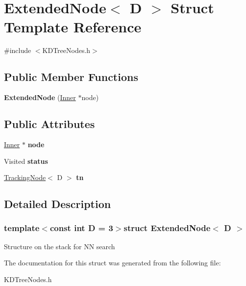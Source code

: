 \hypertarget{structExtendedNode}{\section{Extended\-Node$<$ D $>$ Struct Template Reference}
\label{structExtendedNode}
}


{\ttfamily \#include $<$K\-D\-Tree\-Nodes.\-h$>$}

\subsection*{Public Member Functions}
\begin{DoxyCompactItemize}
\item 
\hypertarget{structExtendedNode_a1aabd3dd499fa6709538c0a489f706ad}{{\bfseries Extended\-Node} (\hyperlink{structInner}{Inner} $\ast$node)}\label{structExtendedNode_a1aabd3dd499fa6709538c0a489f706ad}

\end{DoxyCompactItemize}
\subsection*{Public Attributes}
\begin{DoxyCompactItemize}
\item 
\hypertarget{structExtendedNode_a6170e2575d8ac464549fd92d9e0f9b8e}{\hyperlink{structInner}{Inner} $\ast$ {\bfseries node}}\label{structExtendedNode_a6170e2575d8ac464549fd92d9e0f9b8e}

\item 
\hypertarget{structExtendedNode_ab174b3ed89a3ca4e9f1255fa9633ef90}{Visited {\bfseries status}}\label{structExtendedNode_ab174b3ed89a3ca4e9f1255fa9633ef90}

\item 
\hypertarget{structExtendedNode_ab41952006696c217172449f6e699aac5}{\hyperlink{structTrackingNode}{Tracking\-Node}$<$ D $>$ {\bfseries tn}}\label{structExtendedNode_ab41952006696c217172449f6e699aac5}

\end{DoxyCompactItemize}


\subsection{Detailed Description}
\subsubsection*{template$<$const int D = 3$>$struct Extended\-Node$<$ D $>$}

Structure on the stack for N\-N search 

The documentation for this struct was generated from the following file\-:\begin{DoxyCompactItemize}
\item 
K\-D\-Tree\-Nodes.\-h\end{DoxyCompactItemize}
